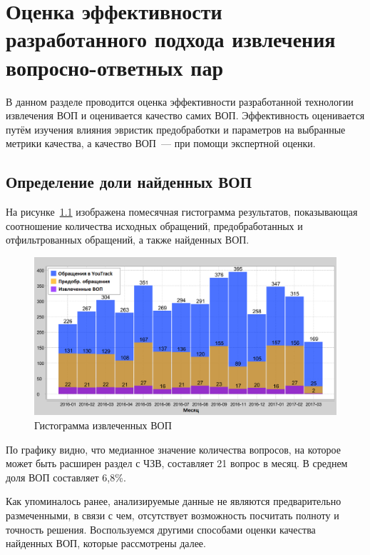 \chapter{Оценка эффективности разработанного подхода извлечения вопросно-ответных пар}
\label{chap:quality}

В данном разделе проводится оценка эффективности разработанной технологии извлечения ВОП и оценивается качество самих ВОП. Эффективность оценивается путём изучения влияния эвристик предобработки и параметров на выбранные метрики качества, а качество ВОП~--- при помощи экспертной оценки.

\section{Определение доли найденных ВОП}

На рисунке~\ref{fig:tickets_distr} изображена помесячная гистограмма результатов, показывающая соотношение количества исходных обращений, предобработанных и отфильтрованных обращений, а также найденных ВОП. 

\begin{figure}[tph!]
\centerline{\includegraphics[width=11.5cm]{fig/tickets_distr.png}}
    \caption{Гистограмма извлеченных ВОП}
    \label{fig:tickets_distr}
\end{figure}

По графику видно, что медианное значение количества вопросов, на которое может быть расширен раздел с ЧЗВ, составляет 21 вопрос в месяц. В среднем доля ВОП составляет 6,8\%.

Как упоминалось ранее, анализируемые данные не являются предварительно размеченными, в связи с чем, отсутствует возможность посчитать полноту и точность решения. Воспользуемся другими способами оценки качества найденных ВОП, которые рассмотрены далее.

